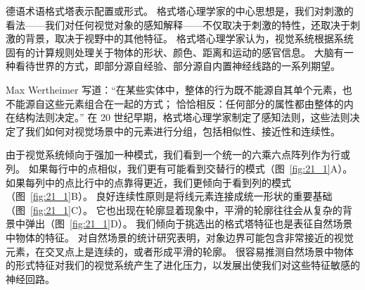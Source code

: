 德语术语格式塔表示配置或形式。
格式塔心理学家的中心思想是，我们对刺激的看法——我们对任何视觉对象的感知解释——不仅取决于刺激的特性，还取决于刺激的背景，取决于视野中的其他特征。
格式塔心理学家认为，视觉系统根据系统固有的计算规则处理关于物体的形状、颜色、距离和运动的感官信息。
大脑有一种看待世界的方式，即部分源自经验、部分源自内置神经线路的一系列期望。


Max Wertheimer 写道：“在某些实体中，整体的行为既不能源自其单个元素，也不能源自这些元素组合在一起的方式；
恰恰相反：任何部分的属性都由整体的内在结构法则决定。” 
在 20 世纪早期，格式塔心理学家制定了感知法则，这些法则决定了我们如何对视觉场景中的元素进行分组，包括相似性、接近性和连续性。


由于视觉系统倾向于强加一种模式，我们看到一个统一的六乘六点阵列作为行或列。
如果每行中的点相似，我们更有可能看到交替行的模式（图~\ref{fig:21_1}A）。
如果每列中的点比行中的点靠得更近，我们更倾向于看到列的模式（图~\ref{fig:21_1}B）。
良好连续性原则是将线元素连接成统一形状的重要基础（图~\ref{fig:21_1}C）。
它也出现在轮廓显着现象中，平滑的轮廓往往会从复杂的背景中弹出（图~\ref{fig:21_1}D）。
我们倾向于挑选出的格式塔特征也是表征自然场景中物体的特征。
对自然场景的统计研究表明，对象边界可能包含非常接近的视觉元素，在交叉点上是连续的，或者形成平滑的轮廓。
很容易推测自然场景中物体的形式特征对我们的视觉系统产生了进化压力，以发展出使我们对这些特征敏感的神经回路。


